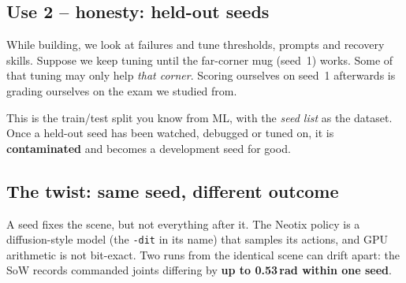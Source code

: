 \documentclass[11pt,a4paper]{article}
\newcommand{\tool}[1]{\texttt{\small #1}}
\begin{document}
\subsection{Use 2 -- honesty: held-out seeds}

While building, we look at failures and tune thresholds, prompts and recovery skills. Suppose we keep tuning until
the far-corner mug (seed~1) works. Some of that tuning may only help \emph{that corner}. Scoring ourselves on seed~1
afterwards is grading ourselves on the exam we studied from.

\begin{center}
\end{center}

\begin{keyidea}
This is the train/test split you know from ML, with the \emph{seed list} as the dataset. Once a held-out seed has been
watched, debugged or tuned on, it is \textbf{contaminated} and becomes a development seed for good.
\end{keyidea}

\subsection{The twist: same seed, different outcome}

A seed fixes the scene, but not everything after it. The Neotix policy is a diffusion-style model (the
\tool{-dit} in its name) that samples its actions, and GPU arithmetic is not bit-exact. Two runs from the identical
scene can drift apart: the SoW records commanded joints differing by \textbf{up to 0.53\,rad within one seed}.
\end{document}
